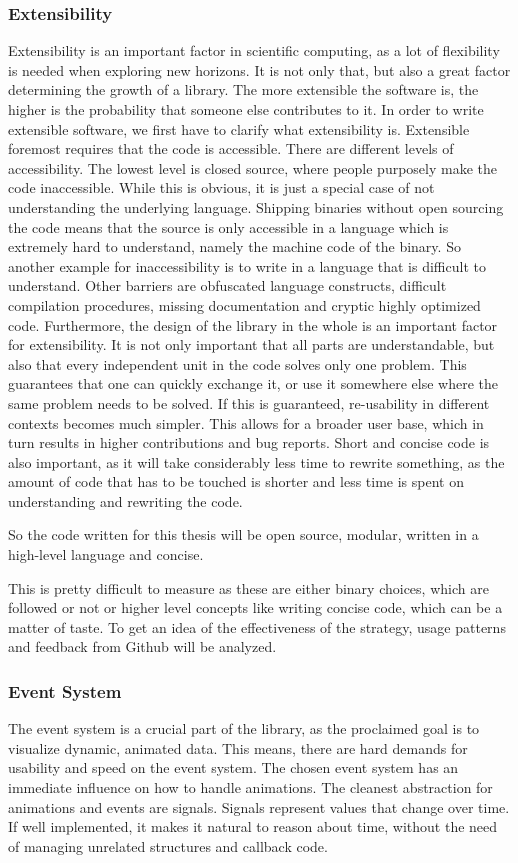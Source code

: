 \subsubsection{Extensibility}
Extensibility is an important factor in scientific computing, as a lot of flexibility is needed when exploring new horizons. 
It is not only that, but also a great factor determining the growth of a library. The more extensible the software is, the higher is the probability that someone else contributes to it.
In order to write extensible software, we first have to clarify what extensibility is.
Extensible foremost requires that the code is accessible. There are different levels of accessibility. 
The lowest level is closed source, where people purposely make the code inaccessible. While this is obvious, it is just a special case of not understanding the underlying language. 
Shipping binaries without open sourcing the code means that the source is only accessible in a language which is extremely hard to understand, namely the machine code of the binary. So another example for inaccessibility is to write in a language that is difficult to understand. 
Other barriers are obfuscated language constructs, difficult compilation procedures, missing documentation and cryptic highly optimized code.
Furthermore, the design of the library in the whole is an important factor for extensibility. It is not only important that all parts are understandable, but also that every independent unit in the code solves only one problem. 
This guarantees that one can quickly exchange it, or use it somewhere else where the same problem needs to be solved.
If this is guaranteed, re-usability in different contexts becomes much simpler. 
This allows for a broader user base, which in turn results in higher contributions and bug reports.
Short and concise code is also important, as it will take considerably less time to rewrite something, as the amount of code that has to be touched is shorter and less time is spent on understanding and rewriting the code.

So the code written for this thesis will be open source, modular, written in a high-level language and concise.

This is pretty difficult to measure as these are either binary choices, which are followed or not or higher level concepts like writing concise code, which can be a matter of taste.
To get an idea of the effectiveness of the strategy, usage patterns and feedback from Github will be analyzed.

\subsubsection{Event System}
The event system is a crucial part of the library, as the proclaimed goal is to visualize dynamic, animated data.
This means, there are hard demands for usability and speed on the event system.
The chosen event system has an immediate influence on how to handle animations. 
The cleanest abstraction for animations and events are signals. Signals represent values that change over time.
If well implemented, it makes it natural to reason about time, without the need of managing unrelated structures and callback code.

